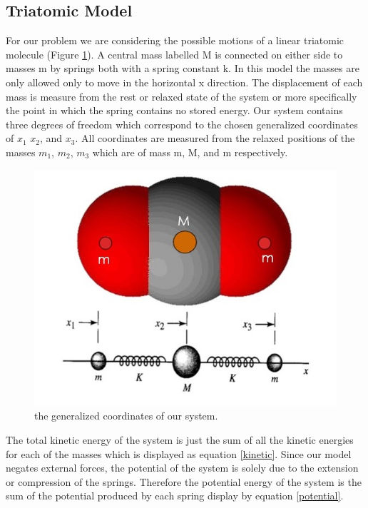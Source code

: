 \documentclass[hidelinks]{article}
\begin{document}
\begin{multicols}{2}

\section{Triatomic Model}



For our problem we are considering the possible motions of a linear triatomic molecule (Figure \ref{model}). A central mass labelled M is connected on either side to masses m by springs both with a spring constant k. In this model the masses are only allowed only to move in the horizontal x direction. The displacement of each mass is measure from the rest or relaxed state of the system or more specifically the point in which the spring contains no stored energy. Our system contains three degrees of freedom which correspond to the chosen generalized coordinates of $x_1$ $x_2$, and $x_3$. All coordinates are measured from the relaxed positions of the masses $m_1$, $m_2$, $m_3$ which are of mass m, M, and m respectively. 

\begin{figure}[H]
\centering
\includegraphics[width=\linewidth]{model}
\caption{the generalized coordinates of our system.}
\label{model}
\end{figure}



The total kinetic energy of the system is just the sum of all the kinetic energies for each of the masses which is displayed as equation \ref{kinetic}. Since our model negates external forces, the potential of the system is solely due to the extension or compression of the springs. Therefore the potential energy of the system is the sum of the potential produced by each spring display by equation \ref{potential}.


\end{multicols}
\end{document}
